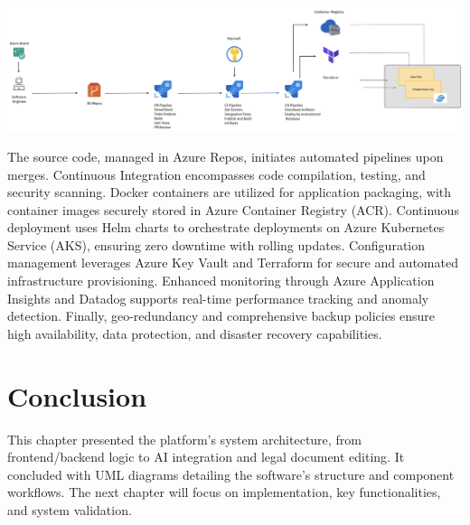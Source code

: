 \begin{center}
    \centering
    \includegraphics[width=1\textwidth]{Images/Deployment Architecture.png}
    \label{fig:deployment_architecture}
\end{center}

The source code, managed in Azure Repos, initiates automated pipelines upon merges. Continuous Integration encompasses code compilation, testing, and security scanning. Docker containers are utilized for application packaging, with container images securely stored in Azure Container Registry (ACR). Continuous deployment uses Helm charts to orchestrate deployments on Azure Kubernetes Service (AKS), ensuring zero downtime with rolling updates. Configuration management leverages Azure Key Vault and Terraform for secure and automated infrastructure provisioning. Enhanced monitoring through Azure Application Insights and Datadog supports real-time performance tracking and anomaly detection. Finally, geo-redundancy and comprehensive backup policies ensure high availability, data protection, and disaster recovery capabilities.

\section{Conclusion}
This chapter presented the platform’s system architecture, from frontend/backend logic to AI integration and legal document editing. It concluded with UML diagrams detailing the software’s structure and component workflows. The next chapter will focus on implementation, key functionalities, and system validation.
